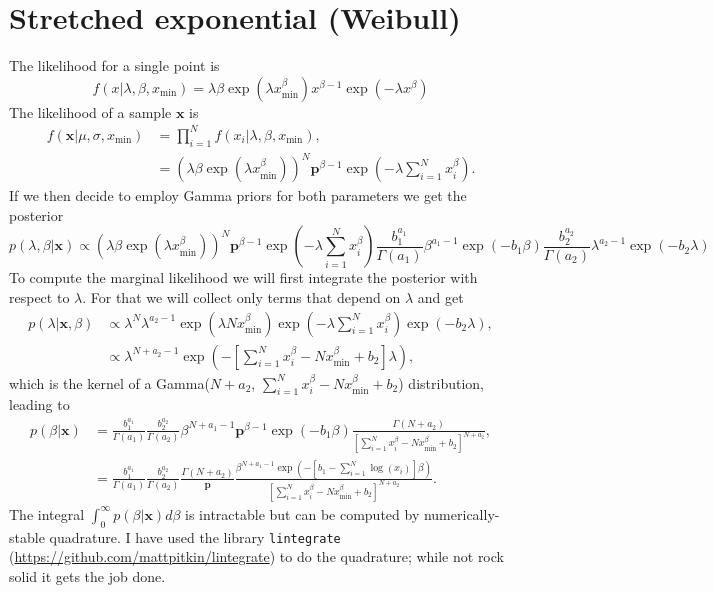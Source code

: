 \documentclass[a4paper, notitlepage, 10pt]{article}
\begin{document}
\section{Stretched exponential (Weibull)}
The likelihood for a single point is
$$ f(x | \lambda, \beta, x_{\min}) = \lambda\beta\exp\left(\lambda x_{\min}^\beta\right) x^{\beta-1} \exp\left(-\lambda x^\beta \right) $$
The likelihood of a sample $\boldsymbol x$ is
\begin{align}
  f(\boldsymbol x | \mu, \sigma, x_{\min}) &= \prod_{i = 1}^N f(x_i | \lambda, \beta, x_{\min}), \\
  &= \left(\lambda\beta\exp\left(\lambda x_{\min}^\beta\right)\right)^N \boldsymbol p^{\beta -1} \exp\left(-\lambda \sum_{i = 1}^N x_i^\beta \right).
\end{align}
If we then decide to employ Gamma priors for both parameters we get the posterior
\begin{equation}
 p(\lambda, \beta | \boldsymbol x) \propto \left(\lambda\beta\exp\left(\lambda x_{\min}^\beta\right)\right)^N \boldsymbol p^{\beta -1} \exp\left(-\lambda \sum_{i = 1}^N x_i^\beta \right) \frac{b_1^{a_1}}{\Gamma(a_1)}\beta^{a_1 - 1}\exp(-b_1\beta) \frac{b_2^{a_2}}{\Gamma(a_2)}\lambda^{a_2 - 1}\exp(-b_2\lambda)
\end{equation}
To compute the marginal likelihood we will first integrate the posterior with respect to $\lambda$.
For that  we will collect only terms that depend on $\lambda$ and get
\begin{align*}
 p(\lambda | \boldsymbol x, \beta) &\propto \lambda^N \lambda^{a_2 -1} \exp\left(\lambda N x_{\min}^\beta\right)\exp\left(-\lambda \sum_{i = 1}^N x_i^\beta \right)\exp(-b_2\lambda), \\
 &\propto \lambda^{N + a_2 -1} \exp\left(-\left[\sum_{i = 1}^N x_i^\beta - N x_{\min}^\beta + b_2\right] \lambda  \right),
\end{align*}
which is the kernel of a Gamma($N + a_2$, $\sum_{i = 1}^N x_i^\beta - N x_{\min}^\beta + b_2$) distribution, leading to
\begin{align}
  p(\beta | \boldsymbol x) &= \frac{b_1^{a_1}}{\Gamma(a_1)} \frac{b_2^{a_2}}{\Gamma(a_2)} \beta^{N + a_1 - 1} \boldsymbol p^{\beta -1} \exp(-b_1\beta)  \frac{\Gamma(N + a_2)}{\left[\sum_{i = 1}^N x_i^\beta  - Nx_{\min}^\beta + b_2\right]^{N + a_2}}, \\
&= \frac{b_1^{a_1}}{\Gamma(a_1)} \frac{b_2^{a_2}}{\Gamma(a_2)}  \frac{\Gamma(N + a_2)}{\boldsymbol p } \frac{\beta^{N + a_1 - 1}  \exp\left(-[b_1 - \sum_{i=1}^N \log(x_i)]\beta\right)}{\left[\sum_{i = 1}^N x_i^\beta - Nx_{\min}^\beta + b_2 \right]^{N + a_2}}.
\end{align}
The integral $\int_0^\infty p(\beta | \boldsymbol x)d\beta$ is intractable but can be computed by numerically-stable quadrature.
I have used the library \verb|lintegrate| (\url{https://github.com/mattpitkin/lintegrate}) to do the quadrature; while not rock solid it gets the job done.


\end{document}
